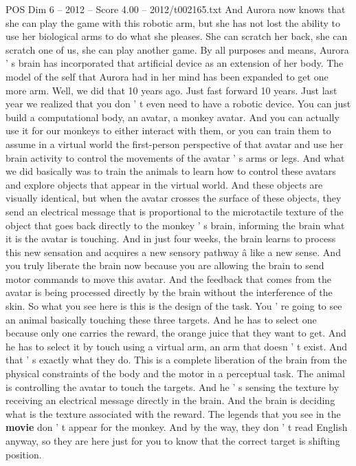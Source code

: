 \begin{textsample}{POS Dim 6 – 2012 – Score 4.00 – 2012/t002165.txt}
And Aurora now knows that she can play the game with this robotic arm, but she has not lost the ability to use her biological arms to do what she pleases.
She can scratch her back, she can scratch one of us, she can play another game.
By all purposes and means, Aurora ' s brain has incorporated that artificial device as an extension of her body.
The model of the self that Aurora had in her mind has been expanded to get one more arm.
Well, we did that 10 years ago.
Just fast forward 10 years.
Just last year we realized that you don ' t even need to have a robotic device.
You can just build a computational body, an avatar, a monkey avatar.
And you can actually use it for our monkeys to either interact with them, or you can train them to assume in a virtual world the first-person perspective of that avatar and use her brain activity to control the movements of the avatar ' s arms or legs.
And what we did basically was to train the animals to learn how to control these avatars and explore objects that appear in the virtual world.
And these objects are visually identical, but when the avatar crosses the surface of these objects, they send an electrical message that is proportional to the microtactile texture of the object that goes back directly to the monkey ' s brain, informing the brain what it is the avatar is touching.
And in just four weeks, the brain learns to process this new sensation and acquires a new sensory pathway â like a new sense.
And you truly liberate the brain now because you are allowing the brain to send motor commands to move this avatar.
And the feedback that comes from the avatar is being processed directly by the brain without the interference of the skin.
So what you see here is this is the design of the task.
You ' re going to see an animal basically touching these three targets.
And he has to select one because only one carries the reward, the orange juice that they want to get.
And he has to select it by touch using a virtual arm, an arm that doesn ' t exist.
And that ' s exactly what they do.
This is a complete liberation of the brain from the physical constraints of the body and the motor in a perceptual task.
The animal is controlling the avatar to touch the targets.
And he ' s sensing the texture by receiving an electrical message directly in the brain.
And the brain is deciding what is the texture associated with the reward.
The legends that you see in the \textbf{movie} don ' t appear for the monkey.
And by the way, they don ' t read English anyway, so they are here just for you to know that the correct target is shifting position.

\end{textsample}
